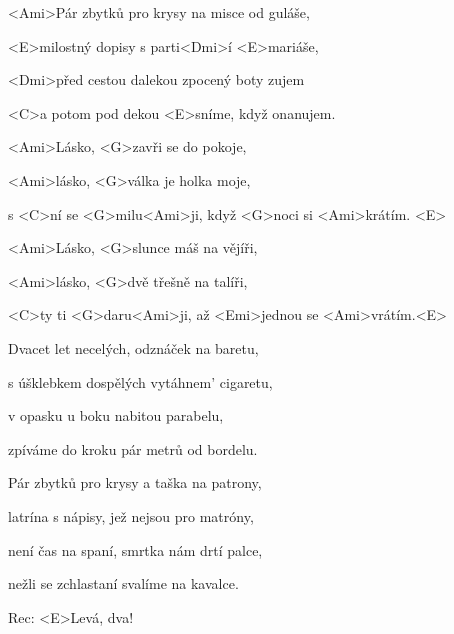 

\zs
<Ami>Pár zbytků pro krysy na misce od guláše,

<E>milostný dopisy s parti<Dmi>í <E>mariáše,

<Dmi>před cestou dalekou zpocený boty zujem

<C>a potom pod dekou <E>sníme, když onanujem.
\ks

\zr
<Ami>Lásko, <G>zavři se do pokoje,

<Ami>lásko, <G>válka je holka moje,

s <C>ní se <G>milu<Ami>ji, když <G>noci si <Ami>krátím. <E>

<Ami>Lásko, <G>slunce máš na vějíři,

<Ami>lásko, <G>dvě třešně na talíři,

<C>ty ti <G>daru<Ami>ji, až <Emi>jednou se <Ami>vrátím.<E>
\kr

\zs
Dvacet let necelých, odznáček na baretu,

s úšklebkem dospělých vytáhnem' cigaretu,

v opasku u boku nabitou parabelu,

zpíváme do kroku pár metrů od bordelu.
\ks

\zr \kr

\zs
Pár zbytků pro krysy a taška na patrony,

latrína s nápisy, jež nejsou pro matróny,

není čas na spaní, smrtka nám drtí palce,

nežli se zchlastaní svalíme na kavalce.
\ks

\zr \kr

Rec: <E>Levá, dva!

\zr \kr

\kp
